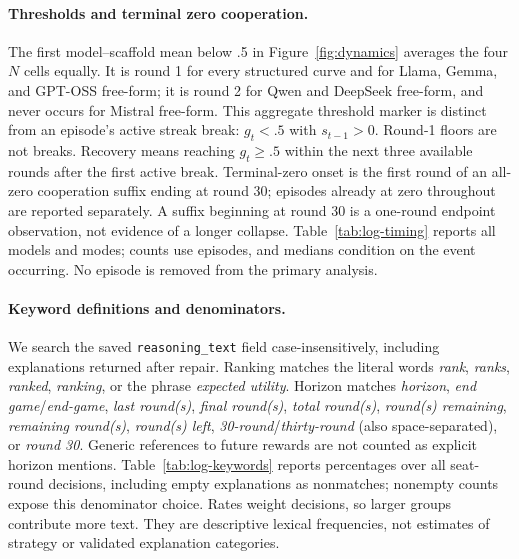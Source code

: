 \documentclass[11pt]{article}
\begin{document}
\paragraph{Thresholds and terminal zero cooperation.}
The first model--scaffold mean below .5 in Figure~\ref{fig:dynamics}
averages the four $N$ cells equally. It is round 1 for every structured
curve and for Llama, Gemma, and GPT-OSS free-form; it is round 2 for
Qwen and DeepSeek free-form, and never occurs for Mistral free-form.
This aggregate threshold marker is distinct from an episode's active
streak break: $g_t<.5$ with $s_{t-1}>0$. Round-1 floors are not breaks.
Recovery means reaching $g_t\geq.5$ within the next three available
rounds after the first active break. Terminal-zero onset is the first
round of an all-zero cooperation suffix ending at round 30; episodes
already at zero throughout are reported separately. A suffix beginning
at round 30 is a one-round endpoint observation, not evidence of a
longer collapse. Table~\ref{tab:log-timing} reports all models and modes;
counts use episodes, and medians condition on the event occurring.
No episode is removed from the primary analysis.


\paragraph{Keyword definitions and denominators.}
We search the saved \texttt{reasoning\_text} field case-insensitively,
including explanations returned after repair. Ranking matches the literal
words \emph{rank}, \emph{ranks}, \emph{ranked}, \emph{ranking}, or the
phrase \emph{expected utility}. Horizon matches \emph{horizon},
\emph{end game}/\emph{end-game}, \emph{last round(s)},
\emph{final round(s)}, \emph{total round(s)},
\emph{round(s) remaining}, \emph{remaining round(s)},
\emph{round(s) left}, \emph{30-round}/\emph{thirty-round}
(also space-separated), or \emph{round 30}.
Generic references to future rewards are not counted as explicit horizon
mentions. Table~\ref{tab:log-keywords} reports percentages over all
seat-round decisions, including empty explanations as nonmatches;
nonempty counts expose this denominator choice. Rates weight decisions,
so larger groups contribute more text. They are descriptive lexical
frequencies, not estimates of strategy or validated explanation categories.

\end{document}
